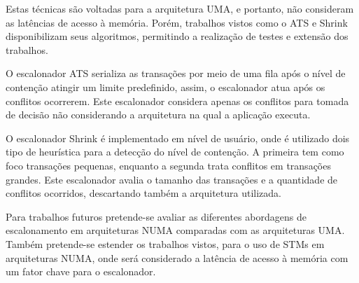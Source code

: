 \documentclass[ti]{texufpel}
\begin{document}
Estas técnicas são voltadas para a arquitetura UMA, e portanto, não consideram as latências de acesso à memória. Porém, trabalhos vistos como o ATS e Shrink disponibilizam seus algoritmos, permitindo a realização de testes e extensão dos trabalhos.

O escalonador ATS serializa as transações por meio de uma fila após o nível de contenção atingir um limite predefinido, assim, o escalonador atua após os conflitos ocorrerem. Este escalonador considera apenas os conflitos para tomada de decisão não considerando a arquitetura na qual a aplicação executa.

O escalonador Shrink é implementado em nível de usuário, onde é utilizado dois tipo de heurística para a detecção do nível de contenção. A primeira tem como foco transações pequenas, enquanto a segunda trata conflitos em transações grandes. Este escalonador avalia o tamanho das transações e a quantidade de conflitos ocorridos, descartando também a arquitetura utilizada.

Para trabalhos futuros pretende-se avaliar as diferentes abordagens de escalonamento em arquiteturas NUMA comparadas com as arquiteturas UMA. Também pretende-se estender os trabalhos vistos, para o uso de STMs em arquiteturas NUMA, onde será considerado a latência de acesso à memória com um fator chave para o escalonador.



\end{document}
